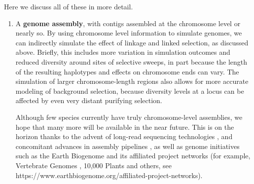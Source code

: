 \documentclass[hidelinks]{article}
\providecommand{\tightlist}{%
\setlength{\itemsep}{0pt}\setlength{\parskip}{0pt}}
\begin{document}
Here we discuss all of these in more detail.

\begin{enumerate}
\def\labelenumi{\arabic{enumi}.}
\tightlist
\item
  A \textbf{genome assembly}, with contigs assembled at the chromosome
  level or nearly so. By using chromosome level information to simulate
  genomes, we can indirectly simulate the effect of linkage and linked
  selection, as discussed above. Briefly, this includes more variation
  in simulation outcomes and reduced diversity around sites of selective
  sweeps, in part because the length of the resulting haplotypes and effects on
  chromosome ends can vary. The simulation of larger chromosome-length regions
  also allows for more accurate modeling of background selection, because
  diversity levels at a locus can be affected by even very distant purifying
  selection.

Although few species currently have truly chromosome-level assemblies,
we hope that many more will be available in the near future.
This is on the horizon thanks to the advent of long-read sequencing technologies
\citep{Amarasinghe2020}, and concomitant advances in assembly pipelines
\citep{Chakraborty2016}, as well as genome initiatives such as the Earth Biogenome
\citep{Lewin2022} and its affiliated project networks (for example,
Vertebrate Genomes \citep{Rhie2021}, 10,000 Plants \citep{Cheng2018} and others,
see https://www.earthbiogenome.org/affiliated-project-networks).


\end{enumerate}
\end{document}
